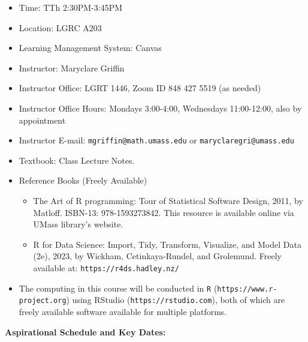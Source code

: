 \documentclass{article}
\begin{document}
\begin{itemize}
\item Time:  TTh 2:30PM-3:45PM \vspace{-2mm}
\item Location:  LGRC A203 \vspace{-2mm}
\item Learning Management System: Canvas \vspace{-2mm}
\item Instructor: Maryclare Griffin  \vspace{-2mm}
\item Instructor Office:  LGRT 1446, Zoom ID 848 427 5519 (as needed) \vspace{-2mm}
\item Instructor Office Hours:  Mondays 3:00-4:00, Wednesdays 11:00-12:00, also by appointment \vspace{-2mm}
\item Instructor E-mail:  \texttt{mgriffin@math.umass.edu} or \texttt{maryclaregri@umass.edu}  \vspace{-2mm}
\item Textbook: Class Lecture Notes.  \vspace{-2mm}
\item Reference Books (Freely Available) \vspace{-2mm}
\begin{itemize}
	\item The Art of R programming: Tour of Statistical Software Design, 
	2011, by Matloff. ISBN-13: 978-1593273842. 
	This resource is available online via UMass library’s website.
	\item R for Data Science: Import, Tidy, Transform, Visualize, and Model Data (2e),
	2023, by Wickham, Cetinkaya-Rundel, and Grolemund.
	Freely available at: {\tt https://r4ds.hadley.nz/}
\end{itemize}
	\item The computing in this course will be conducted in {\tt R} ({\tt https://www.r-project.org}) using RStudio ({\tt https://rstudio.com}), both of which are freely available software available for multiple platforms.  
\end{itemize} 

\clearpage
\noindent \textbf{Aspirational Schedule and Key Dates:} 
\end{document}
